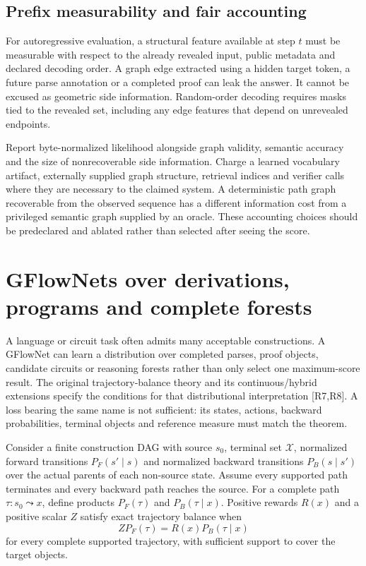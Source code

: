 \subsection{Prefix measurability and fair accounting}

For autoregressive evaluation, a structural feature available at step $t$ must be measurable with respect to the already revealed input, public metadata and declared decoding order. A graph edge extracted using a hidden target token, a future parse annotation or a completed proof can leak the answer. It cannot be excused as geometric side information. Random-order decoding requires masks tied to the revealed set, including any edge features that depend on unrevealed endpoints.

Report byte-normalized likelihood alongside graph validity, semantic accuracy and the size of nonrecoverable side information. Charge a learned vocabulary artifact, externally supplied graph structure, retrieval indices and verifier calls where they are necessary to the claimed system. A deterministic path graph recoverable from the observed sequence has a different information cost from a privileged semantic graph supplied by an oracle. These accounting choices should be predeclared and ablated rather than selected after seeing the score.

\section{GFlowNets over derivations, programs and complete forests}
\label{sec:wb-gfn}

A language or circuit task often admits many acceptable constructions. A GFlowNet can learn a distribution over completed parses, proof objects, candidate circuits or reasoning forests rather than only select one maximum-score result. The original trajectory-balance theory and its continuous/hybrid extensions specify the conditions for that distributional interpretation [R7,R8]. A loss bearing the same name is not sufficient: its states, actions, backward probabilities, terminal objects and reference measure must match the theorem.

Consider a finite construction DAG with source $s_0$, terminal set $\mathcal X$, normalized forward transitions $P_F(s'\mid s)$ and normalized backward transitions $P_B(s\mid s')$ over the actual parents of each non-source state. Assume every supported path terminates and every backward path reaches the source. For a complete path $\tau:s_0\leadsto x$, define products $P_F(\tau)$ and $P_B(\tau\mid x)$. Positive rewards $R(x)$ and a positive scalar $Z$ satisfy exact trajectory balance when
\[
 ZP_F(\tau)=R(x)P_B(\tau\mid x)
\]
for every complete supported trajectory, with sufficient support to cover the target objects.

